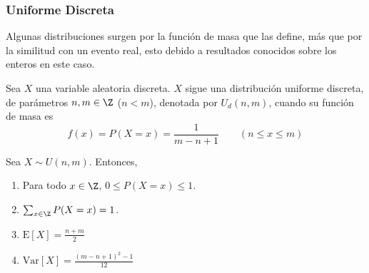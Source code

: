 \subsubsection{Uniforme Discreta}
Algunas distribuciones surgen por la función de masa que las define, más que
por la similitud con un evento real, esto debido a resultados conocidos
sobre los enteros en este caso.

\begin{Def}
  Sea $X$ una variable aleatoria discreta. $X$ sigue una distribución uniforme
  discreta, de parámetros $n,m\in\Z$ ($n < m$), denotada por $U_d(n,m)$,
  cuando su función de masa es
  \[f(x) = P(X=x) = \frac{1}{m-n+1}\qquad (n\leq x\leq m)\]
\end{Def}
\begin{Teo}
  Sea $X\sim U(n,m)$. Entonces,
  \begin{enumerate}
    \item Para todo $x\in\Z$, $0\leq P(X=x)\leq1$.
    \item $\sum_{x\in\Z}P(X=x) = 1$.
    \item $\text{E}[X] = \frac{n+m}{2}$
    \item $\text{Var}[X] = \frac{(m-n+1)^2-1}{12}$
  \end{enumerate}
\end{Teo}
